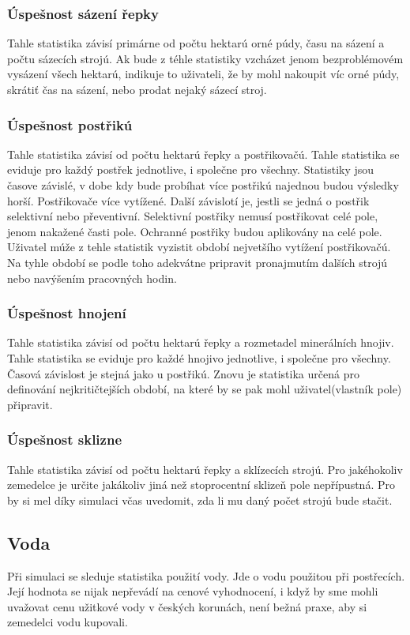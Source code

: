 \documentclass[11pt,a4paper,titlepage]{article}
\begin{document}
\subsubsection{Úspešnost sázení řepky}
Tahle statistika závisí primárne od počtu hektarú orné púdy, času na sázení a počtu sázecích strojú. Ak bude z téhle statistiky vzcházet jenom bezproblémovém vysázení všech hektarú, indikuje to uživateli, že by mohl nakoupit víc orné púdy, skrátiť čas na sázení, nebo prodat nejaký sázecí stroj.
\subsubsection{Úspešnost postřikú}
Tahle statistika závisí od počtu hektarú řepky a postřikovačú. Tahle statistika se eviduje pro každý postřek jednotlive, i společne pro všechny. Statistiky jsou časove závislé, v dobe kdy bude probíhat více postřikú najednou budou výsledky horší. Postřikovače více vytížené. Další závislotí je, jestli se jedná o postřik selektivní nebo převentivní. Selektivní postřiky nemusí postřikovat celé pole, jenom nakažené časti pole. Ochranné postřiky budou aplikovány na celé pole. Uživatel múže z tehle statistik vyzistit období nejvetšího vytížení postřikovačú. Na tyhle období se podle toho adekvátne pripravit pronajmutím dalších strojú nebo navýšením pracovných hodin.
\subsubsection{Úspešnost hnojení}
Tahle statistika závisí od počtu hektarú řepky a rozmetadel minerálních hnojiv. Tahle statistika se eviduje pro každé hnojivo jednotlive, i společne pro všechny. Časová závislost je stejná jako u postřikú. Znovu je statistika určená pro definování nejkritičtejších období, na které by se pak mohl uživatel(vlastník pole) připravit.
\subsubsection{Úspešnost sklizne}
Tahle statistika závisí od počtu hektarú řepky a sklízecích strojú. Pro jakéhokoliv zemedelce je určite jakákoliv jiná než stoprocentní sklizeň pole nepřípustná. Pro by si mel díky simulaci včas uvedomit, zda li mu daný počet strojú bude stačit.
\subsection{Voda}
Při simulaci se sleduje statistika použití vody. Jde o vodu použitou při postřecích. Její hodnota se nijak nepřevádí na cenové vyhodnocení, i když by sme mohli uvažovat cenu užitkové vody v českých korunách, není bežná praxe, aby si zemedelci vodu kupovali.
\end{document}
